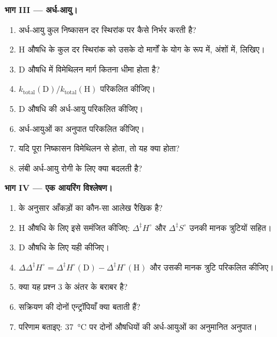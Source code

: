 \begin{problem}
\medskip\noindent\textbf{भाग III --- अर्ध-आयु।}
\begin{enumerate}[resume]
  \item अर्ध-आयु कुल निष्कासन दर स्थिरांक पर कैसे निर्भर करती है?
  \item H औषधि के कुल दर स्थिरांक को उसके दो मार्गों के योग के रूप में,
        अंशों में, लिखिए।
  \item D औषधि में विमेथिलन मार्ग कितना धीमा होता है?
  \item $k_{\mathrm{total}}(\mathrm D)/k_{\mathrm{total}}(\mathrm H)$ परिकलित कीजिए।
  \item D औषधि की अर्ध-आयु परिकलित कीजिए।
  \item अर्ध-आयुओं का अनुपात परिकलित कीजिए।
  \item यदि पूरा निष्कासन विमेथिलन से होता, तो यह क्या होता?
  \item लंबी अर्ध-आयु रोगी के लिए क्या बदलती है?
\end{enumerate}

\medskip\noindent\textbf{भाग IV --- एक आयरिंग विश्लेषण।}
\begin{enumerate}[resume]
  \item {} के अनुसार आँकड़ों का कौन-सा आलेख रैखिक है?
  \item H औषधि के लिए इसे समंजित कीजिए: $\Delta^{\ddagger}H^\circ$ और $\Delta^{\ddagger}S^\circ$ उनकी मानक त्रुटियों सहित।
  \item D औषधि के लिए यही कीजिए।
  \item $\Delta\Delta^{\ddagger}H^\circ = \Delta^{\ddagger}H^\circ(\mathrm D) - \Delta^{\ddagger}H^\circ(\mathrm H)$ और उसकी मानक त्रुटि परिकलित कीजिए।
  \item क्या यह प्रश्न 3 के  अंतर के बराबर है?
  \item सक्रियण की दोनों एन्ट्रॉपियाँ क्या बताती हैं?
  \item परिणाम बताइए: \qty{37}{\celsius} पर दोनों औषधियों की अर्ध-आयुओं का अनुमानित
        अनुपात।
\end{enumerate}
\end{problem}
